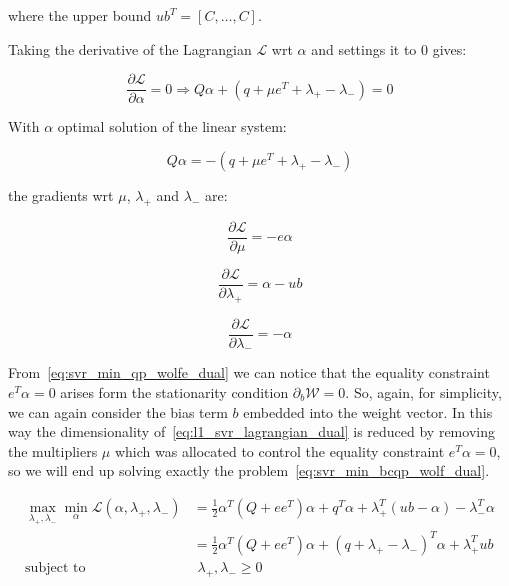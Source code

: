 where the upper bound $ub^T = [C, \dots, C]$.

Taking the derivative of the Lagrangian $\mathcal{L}$ wrt $\alpha$ and settings it to 0 gives:

\begin{equation} \label{eq:svr_lagrangian_der_a}
	\frac{\partial \mathcal{L}}{\partial \alpha}=0\Rightarrow Q \alpha + (q + \mu e^T + \lambda_+ - \lambda_-) = 0
\end{equation}

With $\alpha$ optimal solution of the linear system:

\begin{equation} \label{eq:l1_svr_lagrangian_sol}
    Q \alpha = - (q + \mu e^T + \lambda_+ - \lambda_-)
\end{equation}

the gradients wrt $\mu$, $\lambda_+$ and $\lambda_-$ are:

\begin{equation} \label{eq:svr_lagrangian_der_mu}
	\frac{\partial \mathcal{L}}{\partial \mu}=-e \alpha
\end{equation}

\begin{equation} \label{eq:svr_lagrangian_der_lp}
	\frac{\partial \mathcal{L}}{\partial \lambda_+}=\alpha - ub
\end{equation}

\begin{equation} \label{eq:svr_lagrangian_der_lm}
    \frac{\partial \mathcal{L}}{\partial \lambda_-}=-\alpha
\end{equation}

From~\eqref{eq:svr_min_qp_wolfe_dual} we can notice that the equality constraint $e^T \alpha = 0$ arises form the stationarity condition $\partial_{{b}} \mathcal{W}=0$. So, again, for simplicity, we can again consider the bias term $b$ embedded into the weight vector. In this way the dimensionality of~\eqref{eq:l1_svr_lagrangian_dual} is reduced by removing the multipliers $\mu$ which was allocated to control the equality constraint $e^T \alpha=0$, so we will end up solving exactly the problem~\eqref{eq:svr_min_bcqp_wolf_dual}.

\begin{equation} \label{eq:l1_svr_bcqp_lagrangian_dual}
	\begin{aligned}
    	\max_{\lambda_+,\lambda_-} \min_{\alpha} \mathcal{L}(\alpha,\lambda_+,\lambda_-) &= \frac{1}{2} \alpha^T (Q + ee^T)\alpha+q^T\alpha + \lambda_+^T (ub - \alpha) - \lambda_-^T \alpha \\
    &= \frac{1}{2} \alpha^T (Q + ee^T)\alpha + (q + \lambda_+ - \lambda_-)^T \alpha + \lambda_+^T ub \\
    \text{subject to} \quad & \,\, \lambda_+, \lambda_- \geq 0
	\end{aligned}
\end{equation}

